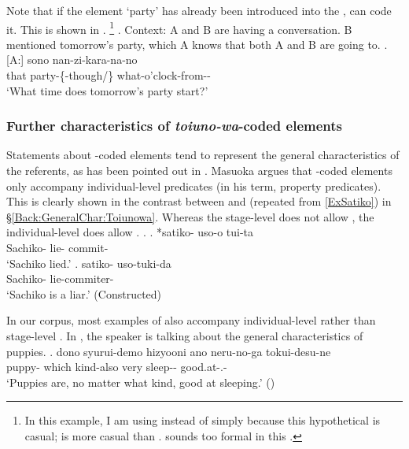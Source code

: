 Note that if the element `party' has already been introduced into the ,  can code it.
This is shown in \Next[A].%
	\footnote{
	In this example, I am using  instead of 
	simply because this hypothetical  is casual;
	 is more casual than .
	 sounds too formal in this .
	}
\ex. \label{Party}Context: A and B are having a conversation. B mentioned tomorrow's party, which A knows that both A and B are going to.
	\ag.[A:] sono  nan-zi-kara-na-no \\
		that party-\{-though/\} what-o'clock-from-- \\
		`What time does tomorrow's party start?' 


\subsubsection{Further characteristics of \textit{toiuno-wa}-coded elements}\label{Par:Topic:Toiunowa:Other}

Statements about -coded elements tend to represent the general characteristics of the referents,
as has been pointed out in .
Masuoka argues that -coded elements only accompany individual-level predicates (in his term, property predicates).
This is clearly shown in the contrast between \Next[a] and \Next[b] (repeated from \ref{ExSatiko}) in \S \ref{Back:GeneralChar:Toiunowa}.
Whereas the stage-level  \Next[a] does not allow ,
the individual-level  \Next[b] does allow .
%
\ex.
\ag. *satiko- uso-o tui-ta \\
     Sachiko- lie- commit- \\
     `Sachiko lied.'
     \hfill{\cite[96]{masuoka12}}
\bg. satiko- uso-tuki-da \\
     Sachiko- lie-commiter- \\
     `Sachiko is a liar.'
     \hfill{(Constructed)}

In our corpus,
most examples of  also accompany individual-level 
rather than stage-level .
In \Next,
the speaker is talking about the general characteristics of puppies.
%
\exg.  dono syurui-demo hizyooni ano neru-no-ga tokui-desu-ne \\
 puppy- which kind-also very  sleep-- good.at-.- \\
 `Puppies are, no matter what kind, good at sleeping.'
 \hfill{()}

